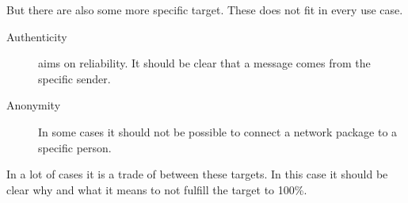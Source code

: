 But there are also some more specific target. These does not fit in every use case.

\begin{description}
	\item[Authenticity] aims on reliability. It should be clear that a message comes from the specific sender.
	
	\item[Anonymity] In some cases it should not be possible to connect a network package to a specific person.
\end{description} 

In a lot of cases it is a trade of between these targets. In this case it should be clear why and what it means to not fulfill the target to 100\%.

